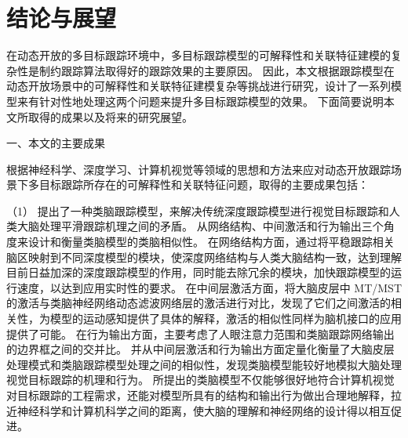 
\chapter*{结论与展望}

在动态开放的多目标跟踪环境中，多目标跟踪模型的可解释性和关联特征建模的复杂性是制约跟踪算法取得好的跟踪效果的主要原因。
因此，本文根据跟踪模型在动态开放场景中的可解释性和关联特征建模复杂等挑战进行研究，设计了一系列模型来有针对性地处理这两个问题来提升多目标跟踪模型的效果。
下面简要说明本文所取得的成果以及将来的研究展望。

一、本文的主要成果

根据神经科学、深度学习、计算机视觉等领域的思想和方法来应对动态开放跟踪场景下多目标跟踪所存在的可解释性和关联特征问题，取得的主要成果包括：

（1）
提出了一种类脑跟踪模型，来解决传统深度跟踪模型进行视觉目标跟踪和人类大脑处理平滑跟踪机理之间的矛盾。
从网络结构、中间激活和行为输出三个角度来设计和衡量类脑模型的类脑相似性。
在网络结构方面，通过将平稳跟踪相关脑区映射到不同深度模型的模块，使深度网络结构与人类大脑结构一致，达到理解目前日益加深的深度跟踪模型的作用，同时能去除冗余的模块，加快跟踪模型的运行速度，以达到应用实时性的要求。
在中间层激活方面，将大脑皮层中 MT/MST 的激活与类脑神经网络动态滤波网络层的激活进行对比，发现了它们之间激活的相关性，为模型的运动感知提供了具体的解释，激活的相似性同样为脑机接口的应用提供了可能。
在行为输出方面，主要考虑了人眼注意力范围和类脑跟踪网络输出的边界框之间的交并比。
并从中间层激活和行为输出方面定量化衡量了大脑皮层处理模式和类脑跟踪模型处理之间的相似性，发现类脑模型能较好地模拟大脑处理视觉目标跟踪的机理和行为。
所提出的类脑模型不仅能够很好地符合计算机视觉对目标跟踪的工程需求，还能对模型所具有的结构和输出行为做出合理地解释，拉近神经科学和计算机科学之间的距离，使大脑的理解和神经网络的设计得以相互促进。


